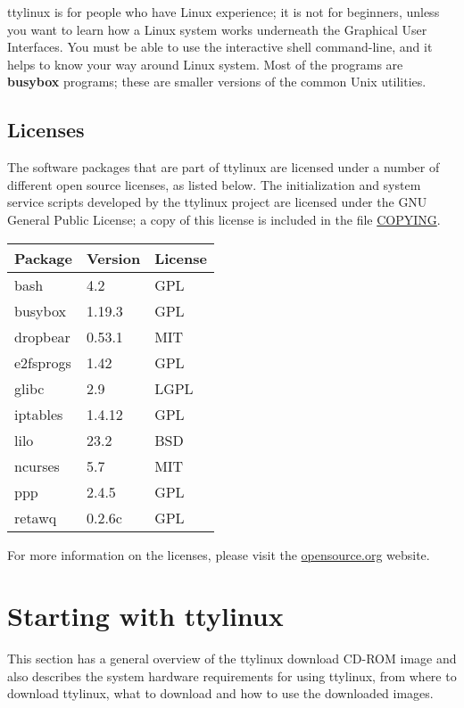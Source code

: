 \documentclass[10pt]{article}
\begin{document}
ttylinux is for people who have Linux experience; it is not for beginners,
unless you want to learn how a Linux system works underneath the Graphical User
Interfaces. You must be able to use the interactive shell command-line, and it
helps to know your way around Linux system. Most of the programs are
{\bf busybox} programs; these are smaller versions of the common Unix utilities.

\subsection{Licenses}

The software packages that are part of ttylinux are licensed under a number of
different open source licenses, as listed below. The initialization and system
service scripts developed by the ttylinux project are licensed under the GNU
General Public License; a copy of this license is included in the file
\url{COPYING}.

\begin{center}
\begin{tabular}{l|l|l}
Package      & Version & License \\
\hline
bash         & 4.2    & GPL  \\
busybox      & 1.19.3 & GPL  \\
dropbear     & 0.53.1 & MIT  \\
e2fsprogs    & 1.42   & GPL  \\
glibc        & 2.9    & LGPL \\
iptables     & 1.4.12 & GPL  \\
lilo         & 23.2   & BSD  \\
ncurses      & 5.7    & MIT  \\
ppp          & 2.4.5  & GPL  \\
retawq       & 0.2.6c & GPL  \\
\end{tabular}
\end{center}

For more information on the licenses, please visit the \url{opensource.org}
website.

\newpage
\section{Starting with ttylinux}

This section has a general overview of the ttylinux download CD-ROM image and
also describes the system hardware requirements for using ttylinux, from where
to download ttylinux, what to download and how to use the downloaded images.
\end{document}
